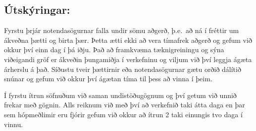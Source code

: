 \documentclass[a4,12pt]{article}
\begin{document}
\subsection{Útskýringar:} Fyrstu þrjár notendasögurnar falla undir sömu aðgerð, þ.e.\ að ná í fréttir um ákveðna þætti og birta þær. Þetta ætti ekki að vera tímafrek aðgerð og gefum við okkur því einn dag í þá iðju. Það að framkvæma tæknigreiningu og sýna viðeigandi gröf er ákveðin þungamiðja í verkefninu og viljum við því leggja ágæta árherslu á það. Síðustu tveir þættirnir eða notendasögurnar gætu orðið dálítið snúnar og gefum við okkur því ágætan tíma til þess að vinna í þeim. 

Í fyrstu ítrun söfnuðum við saman undistöðugögnum og því getum við unnið frekar með gögnin. Alls reiknum við með því að verkefnið taki átta daga en þar sem hópmeðlimir eru fjórir gefum við okkur að ítrun 2 taki einungis tvo daga í vinnu.
\end{document}

